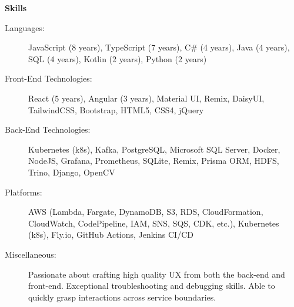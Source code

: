 \documentclass[letterpaper,11pt]{article}
\newcommand{\resheading}[1]{{\large \colorbox{mygrey}{\begin{minipage}{\textwidth}{\textbf{#1 \vphantom{p\^{E}}}}\end{minipage}}}}
\begin{document}
\resheading{Skills}
\begin{description}
	\item[Languages:]
	JavaScript (8 years), TypeScript (7 years), C\# (4 years), Java (4 years), SQL (4 years), Kotlin (2 years), Python (2 years)
	\item[Front-End Technologies:]
	React (5 years), Angular (3 years), Material UI, Remix, DaisyUI, TailwindCSS, Bootstrap, HTML5, CSS4, jQuery
	\item[Back-End Technologies:]
	Kubernetes (k8s), Kafka, PostgreSQL, Microsoft SQL Server, Docker, NodeJS, Grafana, Prometheus, SQLite, Remix, Prisma ORM, HDFS, Trino, Django, OpenCV
	\item[Platforms:]
	AWS (Lambda, Fargate, DynamoDB, S3, RDS, CloudFormation, CloudWatch, CodePipeline, IAM, SNS, SQS, CDK, etc.), Kubernetes (k8s), Fly.io, GitHub Actions, Jenkins CI/CD
	\item[Miscellaneous:]
	Passionate about crafting high quality UX from both the back-end and front-end. Exceptional troubleshooting and debugging skills. Able to quickly grasp interactions across service boundaries.
\end{description}
\end{document}
